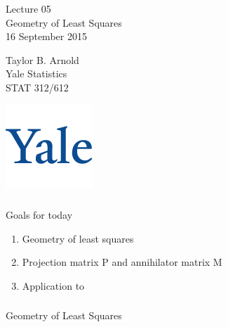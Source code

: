 



\begin{frame}[fragile] \frametitle{}

\vfill

{\fontsize{0.7cm}{0cm}\selectfont Lecture 05 \\\vspace{0.2cm}
Geometry of Least Squares}\\\vspace{0.5cm}
16 September 2015

\vspace{2cm}

\begin{minipage}{0.6\textwidth}
Taylor B. Arnold \\
Yale Statistics \\
STAT 312/612
\end{minipage}
\hfill
\begin{minipage}{0.3\textwidth}\raggedleft
\includegraphics[scale=0.3]{../yale-logo.png}
\end{minipage}%

\end{frame}

\begin{frame}[fragile] \frametitle{}

{\color{yaleblue}\fontsize{16pt}{20pt}\selectfont Goals for today}

\begin{enumerate}
\item Geometry of least squares
\item Projection matrix P and annihilator matrix M
\item Application to
\end{enumerate}

\end{frame}

\begin{frame}[fragile] \frametitle{}

\begin{flushright}
{\color{yaleblue}\sc\fontsize{1cm}{0cm}\selectfont Geometry of Least Squares}
\end{flushright}

\end{frame}

